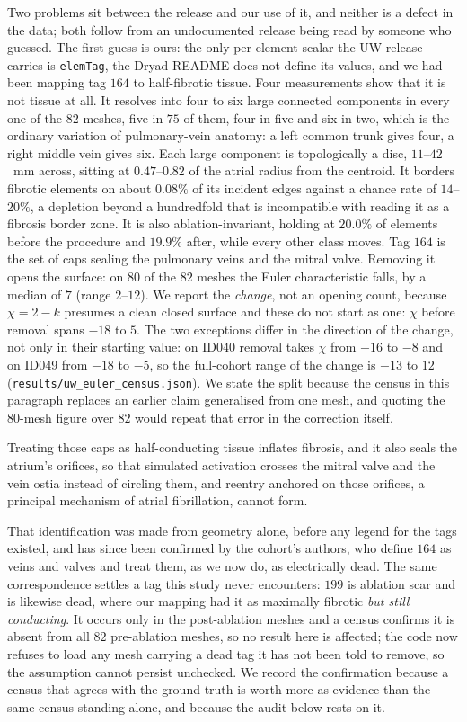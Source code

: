 \documentclass[11pt]{article}
\theoremstyle{definition}
\newcommand{\code}[1]{\texttt{#1}}
\begin{document}
Two problems sit between the release and our use of it, and neither is a defect
in the data; both follow from an undocumented release being read by someone who
guessed. The first guess is ours: the only per-element scalar the UW release
carries is \code{elemTag}, the Dryad README does not define its values, and we
had been mapping tag $164$ to half-fibrotic tissue. Four measurements show that
it is not tissue at all. It resolves into four to six large connected components
in every one of the $82$ meshes, five in $75$ of them, four in five and six in
two, which is the ordinary variation of pulmonary-vein anatomy: a left common
trunk gives four, a right middle vein gives six. Each large component is
topologically a disc, $11$--$42$~mm across, sitting at $0.47$--$0.82$ of the
atrial radius from the centroid. It borders fibrotic elements on about $0.08\%$
of its incident edges against a chance rate of $14$--$20\%$, a depletion beyond
a hundredfold that is incompatible with reading it as a fibrosis border zone. It
is also ablation-invariant, holding at $20.0\%$ of elements before the procedure
and $19.9\%$ after, while every other class moves. Tag $164$ is the set of caps
sealing the pulmonary veins and the mitral valve. Removing it opens the surface:
on $80$ of the $82$ meshes the Euler characteristic falls, by a median of $7$
(range $2$--$12$). We report the \emph{change}, not an opening count,
because $\chi=2-k$ presumes a clean closed surface and these do not start as
one: $\chi$ before removal spans $-18$ to $5$. The two exceptions differ in the
direction of the change, not only in their starting value: on ID040 removal
takes $\chi$
from $-16$ to $-8$ and on ID049 from $-18$ to $-5$, so the full-cohort range
of the change is $-13$ to $12$
(\code{results/\allowbreak uw\allowbreak\_euler\allowbreak\_census.json}).
We state the split because the census in this paragraph replaces an earlier
claim generalised from one mesh, and quoting the $80$-mesh figure over $82$
would repeat that error in the correction itself.

Treating those caps as half-conducting tissue inflates fibrosis, and it also
seals the atrium's orifices, so that simulated activation crosses the mitral
valve and the vein ostia instead of circling them, and reentry anchored on those
orifices, a principal mechanism of atrial fibrillation, cannot form.

That identification was made from geometry alone, before any legend for the tags
existed, and has since been confirmed by the cohort's authors, who define $164$
as veins and valves and treat them, as we now do, as electrically dead. The same
correspondence settles a tag this study never encounters: $199$ is ablation scar
and is likewise dead, where our mapping had it as maximally fibrotic \emph{but
still conducting}. It occurs only in the post-ablation meshes and a census
confirms it is absent from all $82$ pre-ablation meshes, so no result here is
affected; the code now refuses to load any mesh carrying a dead tag it has not
been told to remove, so the assumption cannot persist unchecked. We record the
confirmation because a census that agrees with the ground truth is worth more as
evidence than the same census standing alone, and because the audit below rests
on it.
\end{document}
